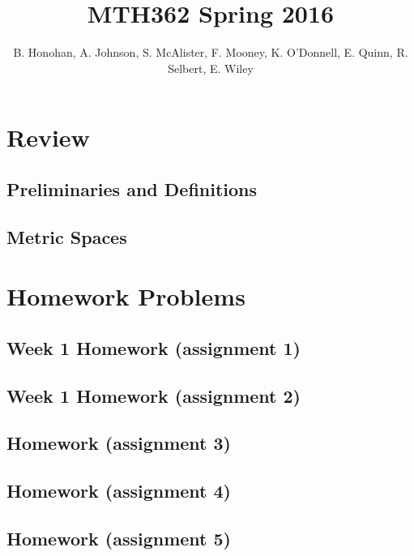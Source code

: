 \documentclass[12pt]{amsbook}
\theoremstyle{plain}
\numberwithin{section}{chapter}
\begin{document}
\title{MTH362 Spring 2016}
\maketitle
\author{B. Honohan, A. Johnson, S. McAlister, F. Mooney, K. O'Donnell, E. Quinn, R. Selbert, E. Wiley}
\setcounter{tocdepth}{4} 
\tableofcontents
\mainmatter 
\chapter{Review}
\section{Preliminaries and Definitions}


\section{Metric Spaces}




\chapter{Homework Problems}
\section{Week 1 Homework (assignment 1)}

\section{Week 1 Homework (assignment 2)}

\section{Homework (assignment 3)}

\section{Homework (assignment 4)}

\section{Homework (assignment 5)}

\end{document}
